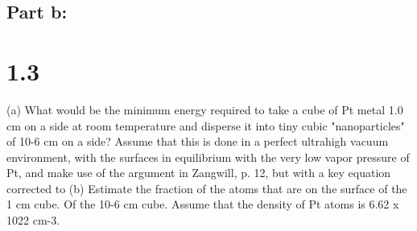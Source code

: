\documentclass[12pt]{article}
\renewcommand{\=}[1]{\stackrel{#1}{=}} %
\theoremstyle{definition}
\theoremstyle{remark}
\begin{document}
\subsection*{Part b:}


\newpage
\section*{1.3}
\begin{bclogo}[logo=\bcquestion , barre=none]
\newline
 (a) What would be the minimum energy required to take a cube of Pt metal 1.0 cm on a
 side at room temperature and disperse it into tiny cubic "nanoparticles" of 10-6
 cm on a side? Assume
 that this is done in a perfect ultrahigh vacuum environment, with the surfaces in equilibrium with the
 very low vapor pressure of Pt, and make use of the argument in Zangwill, p. 12, but with a key equation
 corrected to
 \newline 
 (b) Estimate the fraction of the atoms that are on the surface of the 1 cm cube. Of the 10-6
 cm cube.
 Assume that the density of Pt atoms is 6.62 x 1022 cm-3. 
\end{bclogo}
\vspace{2cm}
\end{document}
